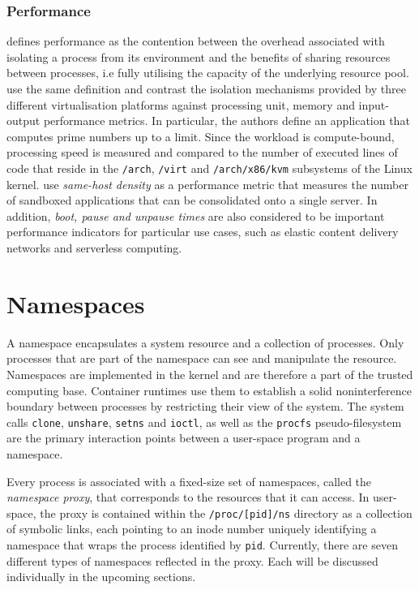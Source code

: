 \subsubsection{Performance}
\label{sections:fundamentals/virtualisation/axioms/performance}
\textcite{10.1145/3365199} defines performance as the contention between the overhead associated 
with isolating a process from its environment and the benefits of sharing resources between processes,
i.e fully utilising the capacity of the underlying resource pool. 
\textcite{10.1145/3381052.3381315} use the same definition and contrast the isolation mechanisms provided
by three different virtualisation platforms against processing unit, memory and input-output performance metrics. 
In particular, the authors define an application that computes prime numbers up to a limit. 
Since the workload is compute-bound, processing speed is measured and compared to the
number of executed lines of code that reside in the \verb|/arch|, \verb|/virt| and \verb|/arch/x86/kvm|
subsystems of the Linux kernel. \textcite{10.1145/3132747.3132763} use \textit{same-host density} as a 
performance metric that measures the number of sandboxed applications that can be consolidated onto a single server.
In addition, \textit{boot, pause and unpause times} are also considered to be important performance indicators for particular 
use cases, such as elastic content delivery networks \cite{10.1145/3050748.3050757} \cite{10.1145/3132747.3132763}
and serverless computing.

\section{Namespaces}
\label{sections:fundamentals/namespaces}
A namespace encapsulates a system resource and a collection of processes. Only processes that are 
part of the namespace can see and manipulate the resource. Namespaces are implemented in the 
kernel and are therefore a part of the trusted computing base. Container runtimes use them 
to establish a solid noninterference boundary between processes by restricting their view of the system. 
The system calls \verb|clone|, \verb|unshare|, \verb|setns| and \verb|ioctl|, as well as the 
\verb|procfs| pseudo-filesystem are the primary interaction points between a user-space program and a namespace.  

Every process is associated with a fixed-size set of namespaces, called the \textit{namespace proxy}, that corresponds to the
resources that it can access.
In user-space, the proxy is contained within the \verb|/proc/[pid]/ns| directory as a 
collection of symbolic links, each pointing to an inode number uniquely identifying a namespace 
that wraps the process identified by \verb|pid|. Currently, there are seven different types 
of namespaces reflected in the proxy. Each will be discussed individually in the upcoming sections. 

